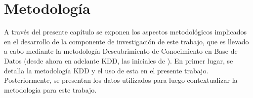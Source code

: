 
\chapter{Metodología}
\label{chp:metodologia}
A través del presente capítulo se exponen los aspectos metodológicos implicados en el desarrollo de la componente de investigación de este trabajo, que es llevado a cabo mediante la metodología Descubrimiento de Conocimiento en Base de Datos (desde ahora en adelante KDD, las iniciales de ). En primer lugar, se detalla la metodología KDD y el uso de esta en el presente trabajo. Posteriormente, se presentan los datos utilizados para luego contextualizar la metodología para este trabajo. 






%